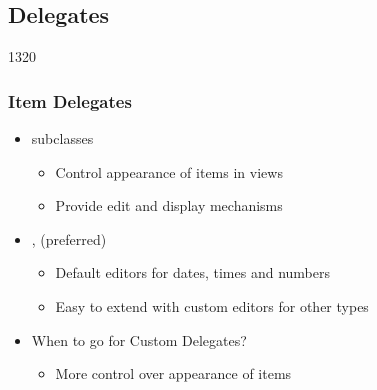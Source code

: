 %
%
%
%

\subsection {Delegates}

\begin{slide}{1320}
  \frametitle{ Item Delegates}
  \begin{itemize}
 \item {} subclasses
    \begin{itemize}
    \item Control appearance of items in views
    \item Provide edit and display mechanisms
   \end{itemize}
  \item {},  (preferred)
    \begin{itemize}
    \item Default editors for dates, times and numbers 
    \item Easy to extend with custom editors for other types
    \end{itemize}
    \medskip
  \item When to go for Custom Delegates?
    \begin{itemize}
    \item More control over appearance of items
    \end{itemize}
  \end{itemize}
\end{slide}


